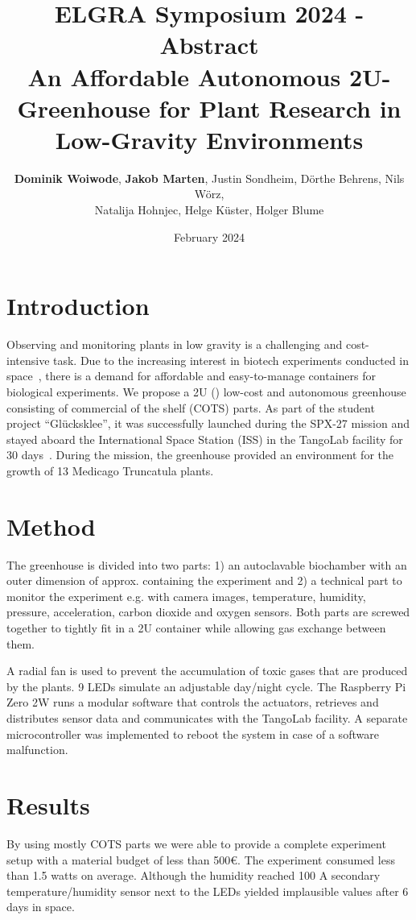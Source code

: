 \documentclass{scrartcl}
\title{ELGRA Symposium 2024 - Abstract\\[0.5cm]\Large An Affordable Autonomous 2U-Greenhouse for Plant Research in Low-Gravity Environments}
\author{\textbf{Dominik Woiwode}, \textbf{Jakob Marten}, \normalsize Justin Sondheim, Dörthe Behrens, Nils Wörz,\\\normalsize Natalija Hohnjec, Helge Küster, Holger Blume 
}
\date{February 2024}
\begin{document}
\maketitle
\section*{Introduction}
Observing and monitoring plants in low gravity is a challenging and cost-intensive task.
Due to the increasing interest in biotech experiments conducted in space~\cite{elsaesser}, there is a demand for affordable and easy-to-manage containers for biological experiments.
We propose a 2U () low-cost and autonomous greenhouse consisting of commercial of the shelf (COTS) parts.
As part of the student project \enquote{Glücksklee}, it was successfully launched during the SPX-27 mission and stayed aboard the International Space Station (ISS) in the TangoLab facility for 30 days~\cite{biospektrum}.
During the mission, the greenhouse provided an environment for the growth of 13 Medicago Truncatula plants.


\section*{Method}
The greenhouse is divided into two parts: 1) an autoclavable biochamber with an outer dimension of approx.  containing the experiment and 2) a technical part to monitor the experiment e.g. with camera images, temperature, humidity, pressure, acceleration, carbon dioxide and oxygen sensors.
Both parts are screwed together to tightly fit in a 2U container while allowing gas exchange between them.

A radial fan is used to prevent the accumulation of toxic gases that are produced by the plants.
9 LEDs simulate an adjustable day/night cycle.
The Raspberry Pi Zero 2W runs a modular software that controls the actuators, retrieves and distributes sensor data and communicates with the TangoLab facility.
A separate microcontroller was implemented to reboot the system in case of a software malfunction.

\section*{Results}
By using mostly COTS parts we were able to provide a complete experiment setup with a material budget of less than 500€.
The experiment consumed less than 1.5 watts on average.
Although the humidity reached 100%
A secondary temperature/humidity sensor next to the LEDs yielded implausible values after 6 days in space.
\end{document}
